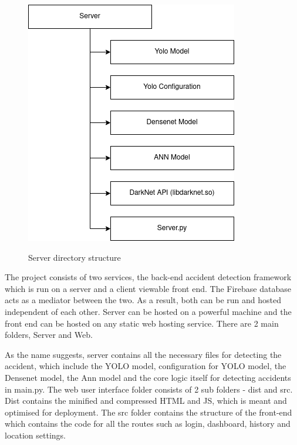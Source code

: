 \documentclass[ 12pt,a4paper,twocolumn,fleqn]{article}
\begin{document}
\begin{adjustwidth}{3.5em}{0pt}
\begin{figure}[H]
\begin{center}
    \hspace*{0.4in}
    \includegraphics[scale=0.6]{media/backend.png}
    \\
  \caption{ Server directory structure}
\end{center}
\end{figure}

The project consists of two services, the back-end accident detection framework which is run on a server and a client viewable front end. The Firebase database acts as a mediator between the two. As a result, both can be run and hosted independent of each other. Server can be hosted on a powerful machine and the front end can be hosted on any static web hosting service. There are 2 main folders, Server and Web. 

\hspace{0.2cm}

As the name suggests, server contains all the necessary files for detecting the accident, which include the YOLO model, configuration for YOLO model, the Densenet model, the Ann model and the core logic itself for detecting accidents in main.py. The web user interface folder consists of 2 sub folders - dist and src. Dist contains the minified and compressed HTML and JS, which is meant and optimised for deployment. The src folder contains the structure of the front-end which contains the code for all the routes such as login, dashboard, history and location settings.


\end{adjustwidth}
\end{document}
